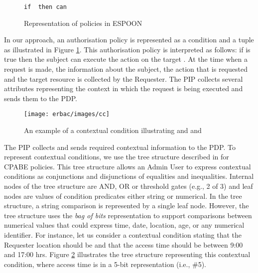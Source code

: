 \documentclass[epsfig,a4paper,11pt,titlepage]{book}
\numberwithin{algorithm}{chapter}
\newcommand{\Keywords}{\lstset{keywords={if,then,can,be,active,in,execute}}}
\begin{document}
\begin{figure} [htp]
\Keywords
\begin{lstlisting}[style=AMMA,numbers=none,breaklines,mathescape,rulesepcolor=\color{black}]
if  then can 

\end{lstlisting}
\caption[Representation of policies in ESPOON]{Representation of policies in \gls{ESPOON}}
\label{fig:espoon-policy-representation}
\end{figure}

In our approach, an authorisation policy is represented as a condition and a tuple as illustrated in Figure \ref{fig:espoon-policy-representation}. This authorisation policy is interpreted as follows: if  is true then the subject  can execute the action  on the target . At the time when a request is made, the information about the subject, the action that is requested and the target resource is collected by the Requester. The \gls{PIP} collects several attributes representing the context in which the request is being executed and sends them to the \gls{PDP}.

\begin{figure} [htp]
\centering
\texttt{[image: erbac/images/cc]}
\caption[An example of a contextual condition]{An example of a contextual condition illustrating  and  and }
\label{fig:erbac-cc}
\end{figure}


The \gls{PIP} collects and sends required contextual information to the \gls{PDP}. To represent contextual conditions, we use the tree structure described in \cite{Bethencourt:2007} for \gls{CPABE} policies. This tree structure allows an Admin User to express contextual conditions as conjunctions and disjunctions of equalities and inequalities. Internal nodes of the tree structure are AND, OR or threshold gates (e.g., 2 of 3) and leaf nodes are values of condition predicates either string or numerical. In the tree structure, a string comparison is represented by a single leaf node. However, the tree structure uses the \emph{bag of bits} representation to support comparisons between numerical values that could express time, date, location, age, or any numerical identifier. For instance, let us consider a contextual condition stating that the Requester location should be  and that the access time should be between 9:00 and 17:00 hrs. Figure \ref{fig:erbac-cc} illustrates the tree structure representing this contextual condition, where access time is in a 5-bit representation (i.e., \#5).
\end{document}
